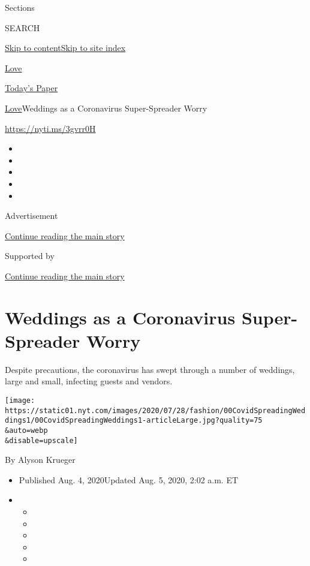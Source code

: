 Sections

SEARCH

\protect\hyperlink{site-content}{Skip to
content}\protect\hyperlink{site-index}{Skip to site index}

\href{https://www.nytimes.com/section/fashion/weddings}{Love}

\href{https://myaccount.nytimes.com/auth/login?response_type=cookie\&client_id=vi}{}

\href{https://www.nytimes.com/section/todayspaper}{Today's Paper}

\href{/section/fashion/weddings}{Love}\textbar{}Weddings as a
Coronavirus Super-Spreader Worry

\url{https://nyti.ms/3gvrr0H}

\begin{itemize}
\item
\item
\item
\item
\item
\end{itemize}

Advertisement

\protect\hyperlink{after-top}{Continue reading the main story}

Supported by

\protect\hyperlink{after-sponsor}{Continue reading the main story}

\hypertarget{weddings-as-a-coronavirus-super-spreader-worry}{%
\section{Weddings as a Coronavirus Super-Spreader
Worry}\label{weddings-as-a-coronavirus-super-spreader-worry}}

Despite precautions, the coronavirus has swept through a number of
weddings, large and small, infecting guests and vendors.

\texttt{[image: https://static01.nyt.com/images/2020/07/28/fashion/00CovidSpreadingWeddings1/00CovidSpreadingWeddings1-articleLarge.jpg?quality=75\\\&auto=webp\\\&disable=upscale]}

By Alyson Krueger

\begin{itemize}
\item
  Published Aug. 4, 2020Updated Aug. 5, 2020, 2:02 a.m. ET
\item
  \begin{itemize}
  \item
  \item
  \item
  \item
  \item
  \end{itemize}
\end{itemize}

